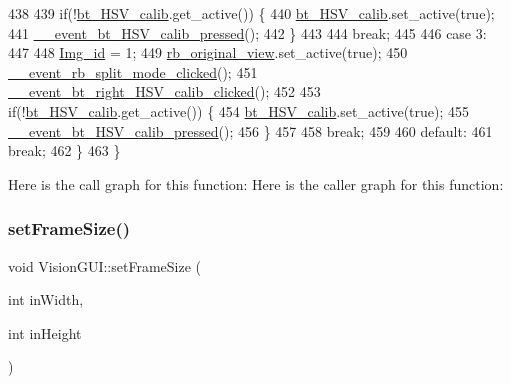\begin{DoxyCode}
438 
439             \textcolor{keywordflow}{if}(!\hyperlink{class_vision_g_u_i_a9506af83c1ee97d1b4f32b3fbb53fc48}{bt\_HSV\_calib}.get\_active()) \{
440                 \hyperlink{class_vision_g_u_i_a9506af83c1ee97d1b4f32b3fbb53fc48}{bt\_HSV\_calib}.set\_active(\textcolor{keyword}{true});
441                 \hyperlink{class_vision_g_u_i_ad476738b0d45d8decb5d5789c7cbc611}{\_\_event\_bt\_HSV\_calib\_pressed}();
442             \}
443 
444             \textcolor{keywordflow}{break};
445 
446         \textcolor{keywordflow}{case} 3:
447 
448             \hyperlink{class_vision_g_u_i_a4a46f114bc58e0f1d56b655f4bc8f9d8}{Img\_id} = 1;
449             \hyperlink{class_vision_g_u_i_abb4ca4d613412da2ce06c55a8a37a7f2}{rb\_original\_view}.set\_active(\textcolor{keyword}{true});
450             \hyperlink{class_vision_g_u_i_a51c0888c14eb2b773e18d739df076e03}{\_\_event\_rb\_split\_mode\_clicked}();
451             \hyperlink{class_vision_g_u_i_a5de4edcfe2bd349f940dc605a52bc70b}{\_\_event\_bt\_right\_HSV\_calib\_clicked}();
452 
453             \textcolor{keywordflow}{if}(!\hyperlink{class_vision_g_u_i_a9506af83c1ee97d1b4f32b3fbb53fc48}{bt\_HSV\_calib}.get\_active()) \{
454                 \hyperlink{class_vision_g_u_i_a9506af83c1ee97d1b4f32b3fbb53fc48}{bt\_HSV\_calib}.set\_active(\textcolor{keyword}{true});
455                 \hyperlink{class_vision_g_u_i_ad476738b0d45d8decb5d5789c7cbc611}{\_\_event\_bt\_HSV\_calib\_pressed}();
456             \}
457 
458             \textcolor{keywordflow}{break};
459 
460         \textcolor{keywordflow}{default}:
461             \textcolor{keywordflow}{break};
462     \}
463 \}
\end{DoxyCode}
Here is the call graph for this function\+:
Here is the caller graph for this function\+:
\mbox{\label{class_vision_g_u_i_afd0b5f34c6a9691ab2fe83c49abae95a}} 
\subsubsection{\texorpdfstring{set\+Frame\+Size()}{setFrameSize()}}
{\footnotesize\ttfamily void Vision\+G\+U\+I\+::set\+Frame\+Size (\begin{DoxyParamCaption}\item[{int}]{in\+Width,  }\item[{int}]{in\+Height }\end{DoxyParamCaption})}



